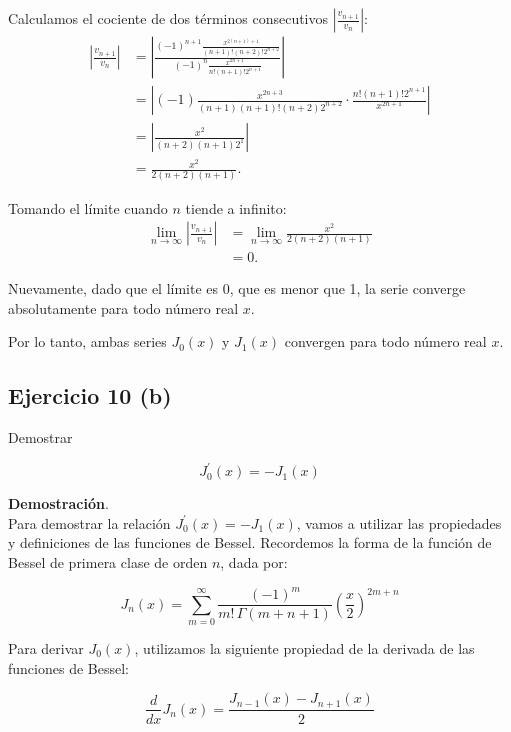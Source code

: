 \documentclass{article}
\begin{document}
    Calculamos el cociente de dos términos consecutivos \( \left| \frac{v_{n+1}}{v_n} \right| \):
        \begin{align*}
        \left| \frac{v_{n+1}}{v_n} \right| &= \left| \frac{(-1)^{n+1} \frac{x^{2(n+1)+1}}{(n+1)!(n+2)! 2^{n+2}}}{(-1)^n \frac{x^{2n+1}}{n!(n+1)! 2^{n+1}}} \right| \\
        &= \left| (-1) \frac{x^{2n+3}}{(n+1)(n+1)! (n+2) 2^{n+2}} \cdot \frac{n!(n+1)! 2^{n+1}}{x^{2n+1}} \right| \\
        &= \left| \frac{x^2}{(n+2)(n+1)2^1} \right| \\
        &= \frac{x^2}{2(n+2)(n+1)}.
        \end{align*}

    Tomando el límite cuando \( n \) tiende a infinito:
        \begin{align*}
        \lim_{n \to \infty} \left| \frac{v_{n+1}}{v_n} \right| &= \lim_{n \to \infty} \frac{x^2}{2(n+2)(n+1)} \\
        &= 0.
        \end{align*}

    Nuevamente, dado que el límite es 0, que es menor que 1, la serie converge absolutamente para todo número real \( x \).

    Por lo tanto, ambas series \( J_0(x) \) y \( J_1(x) \) convergen para todo número real \( x \).

    \subsection*{Ejercicio 10 (b)}

    Demostrar

    $$
    J_{0}^{\prime}(x)=-J_{1}(x)
    $$

    \textbf{Demostración}.\\

    Para demostrar la relación \(J_{0}^{\prime}(x)=-J_{1}(x)\), vamos a utilizar las propiedades y definiciones de las funciones de Bessel.
    Recordemos la forma de la función de Bessel de primera clase de orden \(n\), dada por:

    \[
    J_n(x) = \sum_{m=0}^{\infty}\frac{(-1)^m}{m! \, \Gamma(m+n+1)}\left( \frac{x}{2} \right)^{2m+n}
    \]

    Para derivar \(J_0(x)\), utilizamos la siguiente propiedad de la derivada de las funciones de Bessel:

    \[
    \frac{d}{dx} J_n(x) = \frac{J_{n-1}(x) - J_{n+1}(x)}{2}
    \]
\end{document}
